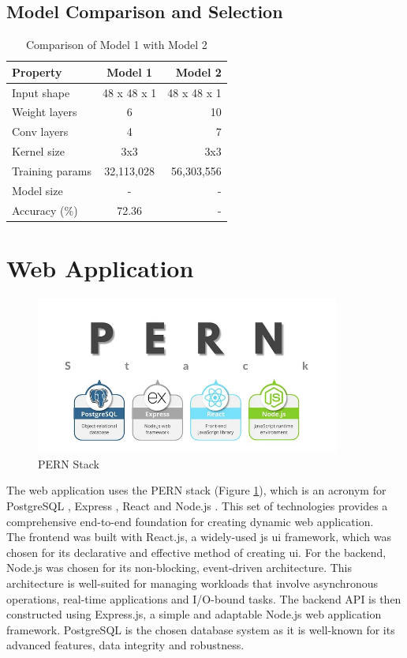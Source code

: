 \subsection{Model Comparison and Selection}
\begin{table}[ht]
    \centering
    \renewcommand{\arraystretch}{1.5}
    \begin{tabular*}{\textwidth}{@{\extracolsep{\fill}}lcr}
    \toprule
    \textbf{Property} & \textbf{Model 1} & \textbf{Model 2} \\
    \midrule
    Input shape & 48 x 48 x 1 & 48 x 48 x 1 \\
    Weight layers & 6 & 10 \\
    Conv layers & 4 & 7 \\
    Kernel size & 3x3 & 3x3 \\
    Training params & 32,113,028 & 56,303,556 \\
    Model size & - & - \\
    Accuracy (\%) & 72.36 & - \\
    \bottomrule
    \end{tabular*}
    \caption{Comparison of Model 1 with Model 2}
    \label{tab:comparison-models}
\end{table}
\section{Web Application}
\begin{figure}[h!]
    \centering
    \includegraphics[width=10cm]{Images/pern.png}
    \caption{PERN Stack \citep{alves_2023_get}}
    \label{fig:pern}
\end{figure}
The web application uses the PERN stack (Figure \ref{fig:pern}), which is an acronym for PostgreSQL \citep{thepostgresqlglobaldevelopmentgroup_2019_postgresql}, Express \citep{openjsfoundation_2017_express}, React \citep{metaopensource_2024_react} and Node.js \citep{nodejs_2023_nodejs}.
This set of technologies provides a comprehensive end-to-end foundation for creating dynamic web application.
\\
\indent The frontend was built with React.js, a widely-used \gls{js} \gls{ui} framework, which was chosen for its declarative and effective method of creating \gls{ui}.
For the backend, Node.js was chosen for its non-blocking, event-driven architecture.
This architecture is well-suited for managing workloads that involve asynchronous operations, real-time applications and I/O-bound tasks.
The backend API is then constructed using Express.js, a simple and adaptable Node.js web application framework.
PostgreSQL is the chosen database system as it is well-known for its advanced features, data integrity and robustness.
